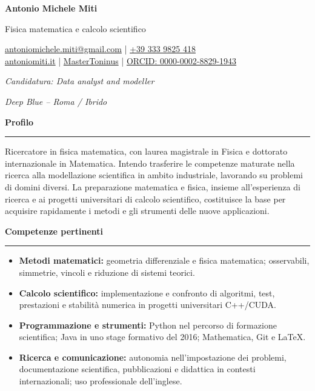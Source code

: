 \documentclass[10pt,a4paper]{article}
\newcommand{\cvsection}[1]{%
    \Needspace{4\baselineskip}%
    \vspace{0.8em}%
    {\large\bfseries\color{accent} #1}\par
    \vspace{0.2em}\hrule\vspace{0.45em}%
}
\begin{document}
{\Huge\bfseries Antonio Michele Miti}\par
\vspace{0.25em}
{\large\color{accent} Fisica matematica e calcolo scientifico}\par
    \vspace{0.1em}
    \begin{center}
        \href{mailto:antoniomichele.miti@gmail.com}{%
                \faEnvelope\enspace antoniomichele.miti@gmail.com}  |
        \href{tel:+393339825418}{\faPhone\enspace +39 333 9825 418} \\[3pt]
        \href{https://www.antoniomiti.it/}{\faGlobe\enspace antoniomiti.it} |
        \href{https://github.com/MasterToninus}{\faGithub\enspace MasterToninus} |
        \href{https://orcid.org/0000-0002-8829-1943}{%
            \faOrcid\enspace ORCID: 0000-0002-8829-1943}
    \end{center}
    \vspace{0.1em}
\textit{Candidatura: Data analyst and modeller}\par
\textit{Deep Blue -- Roma / Ibrido}\par



\cvsection{Profilo}
{Ricercatore in fisica matematica, con laurea magistrale in Fisica e dottorato internazionale in Matematica. Intendo trasferire le competenze maturate nella ricerca alla modellazione scientifica in ambito industriale, lavorando su problemi di domini diversi. La preparazione matematica e fisica, insieme all'esperienza di ricerca e ai progetti universitari di calcolo scientifico, costituisce la base per acquisire rapidamente i metodi e gli strumenti delle nuove applicazioni.}

\cvsection{Competenze pertinenti}
\begin{itemize}
    \item {\textbf{Metodi matematici:} geometria differenziale e fisica matematica; osservabili, simmetrie, vincoli e riduzione di sistemi teorici.}
    \item {\textbf{Calcolo scientifico:} implementazione e confronto di algoritmi, test, prestazioni e stabilità numerica in progetti universitari C++/CUDA.}
    \item {\textbf{Programmazione e strumenti:} Python nel percorso di formazione scientifica; Java in uno stage formativo del 2016; Mathematica, Git e \LaTeX.}
    \item {\textbf{Ricerca e comunicazione:} autonomia nell'impostazione dei problemi, documentazione scientifica, pubblicazioni e didattica in contesti internazionali; uso professionale dell'inglese.}
\end{itemize}
\end{document}
